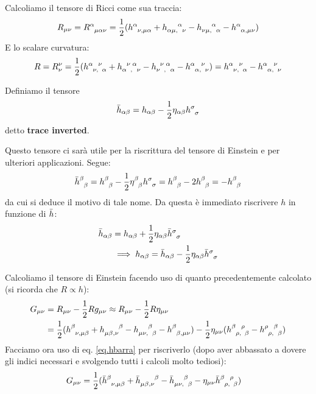 Calcoliamo il tensore di Ricci come sua traccia:
\begin{equation*}
    R_{\mu\nu}=\tensor{R}{^\alpha_{\mu\alpha\nu}}=\frac{1}{2}(\tensor{h}{^\alpha_{\nu,\mu\alpha}} + \tensor{h}{_{\alpha\mu,}^\alpha_\nu} - \tensor{h}{_{\nu\mu,}^\alpha_\alpha} - \tensor{h}{^\alpha_{\alpha,\mu\nu}})
\end{equation*}
E lo scalare curvatura:
\begin{equation*}
    R= R^\nu_\nu = \frac{1}{2}(\tensor{h}{^\alpha_{\nu,}^\nu_\alpha} + \tensor{h}{_\alpha^\nu_,^\alpha_\nu} - \tensor{h}{_\nu^\nu _{,} ^\alpha_\alpha} - \tensor{h}{^\alpha_{\alpha,}^\nu_\nu}) = \tensor{h}{^\alpha_\nu_,^\nu_\alpha} - \tensor{h}{^\alpha_{\alpha,}^\nu_\nu}
\end{equation*}
\begin{definizione}
Definiamo il tensore
\begin{equation}
    \Bar{h}_{\alpha\beta}= h_{\alpha\beta} -\frac{1}{2}\eta_{\alpha\beta}\tensor{h}{^\sigma_\sigma}
    \label{eq.hbarra}
\end{equation}
detto \textbf{trace inverted}.
\end{definizione}
Questo tensore ci sarà utile per la riscrittura del tensore di Einstein e per ulteriori applicazioni. Segue:
\begin{equation*}
    \tensor{\Bar{h}}{^\beta_\beta} =\tensor{h}{^\beta_\beta} -\frac{1}{2}\tensor{\eta}{^\beta_\beta}\tensor{h}{^\sigma_\sigma} = \tensor{h}{^\beta_\beta} -2\tensor{h}{^\beta_\beta} = - \tensor{h}{^\beta_\beta}
\end{equation*}
da cui si deduce il motivo di tale nome. Da questa è immediato riscrivere $h$ in funzione di $\Bar{h}$:
\begin{align*}
    \Bar{h}_{\alpha\beta} &= h_{\alpha\beta} + \frac{1}{2}\eta_{\alpha\beta}\tensor{\Bar{h}}{^\sigma_\sigma} \\
    &\implies h_{\alpha\beta}= \Bar{h}_{\alpha\beta} -\frac{1}{2}\eta_{\alpha\beta}\tensor{\Bar{h}}{^\sigma_\sigma}
\end{align*}

Calcoliamo il tensore di Einstein facendo uso di quanto precedentemente calcolato (si ricorda che $R\propto h$):
\begin{align*}
    G_{\mu\nu} &= R_{\mu\nu} -\frac{1}{2}R g_{\mu\nu} \approx R_{\mu\nu} - \frac{1}{2}R\eta_{\mu\nu} \\
    &=\frac{1}{2}( \tensor{h}{^\beta_{\nu,\mu\beta}} + \tensor{h}{_{\mu\beta,\nu}^\beta} - \tensor{h}{_{\mu\nu,}^\beta_\beta} -\tensor{h}{^\beta_{\beta,\mu\nu}}) -\frac{1}{2}\eta_{\mu\nu}( \tensor{h}{^\beta_{\rho,}^\rho_\beta} -\tensor{h}{^\rho_{\rho,}^\beta_\beta} )
\end{align*}
Facciamo ora uso di eq. \ref{eq.hbarra} per riscriverlo (dopo aver abbassato a dovere gli indici necessari e svolgendo tutti i calcoli molto tediosi):
\begin{align*}
    G_{\mu\nu} &= \frac{1}{2} (\tensor{\Bar{h}}{^\beta_{\nu,\mu\beta}} + \tensor{\Bar{h}}{_{\mu\beta,\nu}^\beta} - \tensor{\Bar{h}}{_{\mu\nu,}^\beta_\beta} - \eta_{\mu\nu}\tensor{\Bar{h}}{^\beta_{\rho,}^\rho_\beta} ) 
\end{align*}

